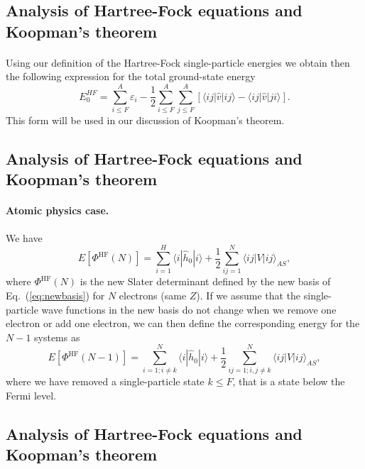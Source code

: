 \documentclass[%
twoside,                 %
final,                   %
10pt]{article}
\begin{document}
\subsection*{Analysis of Hartree-Fock equations and Koopman's theorem}

\paragraph{}
Using our definition of the Hartree-Fock single-particle energies we obtain then the following expression for the total ground-state energy
\[
  E_0^{HF}
  = \sum_{i\le F}^A \varepsilon_i - \frac{1}{2}\sum_{i\le F}^A\sum_{j \le F}^A\left[\langle ij |\hat{v}|ij \rangle-\langle ij|\hat{v}|ji\rangle\right].
\]
This form will be used in our discussion of Koopman's theorem.



\subsection*{Analysis of Hartree-Fock equations and Koopman's theorem}

\paragraph{Atomic physics case.}
We have 
\[
  E[\Phi^{\mathrm{HF}}(N)] 
  = \sum_{i=1}^H \langle i | \hat{h}_0 | i \rangle +
  \frac{1}{2}\sum_{ij=1}^N\langle ij|V|ij\rangle_{AS},
\]
where $\Phi^{\mathrm{HF}}(N)$ is the new Slater determinant defined by the new basis of Eq.~(\ref{eq:newbasis})
for $N$ electrons (same $Z$).  If we assume that the single-particle wave functions in the new basis do not change 
when we remove one electron or add one electron, we can then define the corresponding energy for the $N-1$ systems as 
\[
  E[\Phi^{\mathrm{HF}}(N-1)] 
  = \sum_{i=1; i\ne k}^N \langle i | \hat{h}_0 | i \rangle +
  \frac{1}{2}\sum_{ij=1;i,j\ne k}^N\langle ij|V|ij\rangle_{AS},
\]
where we have removed a single-particle state $k\le F$, that is a state below the Fermi level.



\subsection*{Analysis of Hartree-Fock equations and Koopman's theorem}
\end{document}
